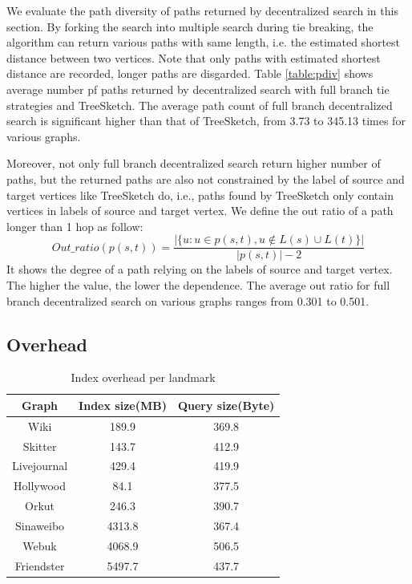 We evaluate the path diversity of paths returned by decentralized search in this section. By forking the search into multiple search during tie breaking, the algorithm can return various paths with same length, i.e. the estimated shortest distance between two vertices. Note that only paths with estimated shortest distance are recorded, longer paths are disgarded. Table \ref{table:pdiv} shows average number pf paths returned by decentralized search with full branch tie strategies and TreeSketch. The average path count of full branch decentralized search is significant higher than that of TreeSketch, from 3.73 to 345.13 times for various graphs. 

Moreover, not only full branch decentralized search return higher number of paths, but the returned paths are also not constrained by the label of source and target vertices like TreeSketch do, i.e., paths found by TreeSketch only contain vertices in labels of source and target vertex. We define the out ratio of a path longer than 1 hop as follow:
\[
Out\_ratio(p(s,t)) = \frac{|\{u:u \in p(s,t), u \notin L(s) \cup L(t)\}|}{|p(s,t)| - 2}
\]
It shows the degree of a path relying on the labels of source and target vertex. The higher the value, the lower the dependence. The average out ratio for full branch decentralized search on various graphs ranges from 0.301 to 0.501.

\subsection{Overhead}
\label{eval_overhead}

\begin{table}
		\caption{Index overhead per landmark}
    \label{table:ioh}
    \centering
    \begin{tabular}{c|cc} \hline
				Graph&Index size(MB)&Query size(Byte)\\ \hline
				Wiki&189.9&369.8 \\ 
				Skitter&143.7&412.9 \\ 
				Livejournal&429.4&419.9 \\ 
				Hollywood&84.1&377.5 \\ 
				Orkut&246.3&390.7 \\ 
				Sinaweibo&4313.8&367.4 \\ 
				Webuk&4068.9&506.5 \\ 
				Friendster&5497.7&437.7 \\ \hline
    \end{tabular}
\end{table}

